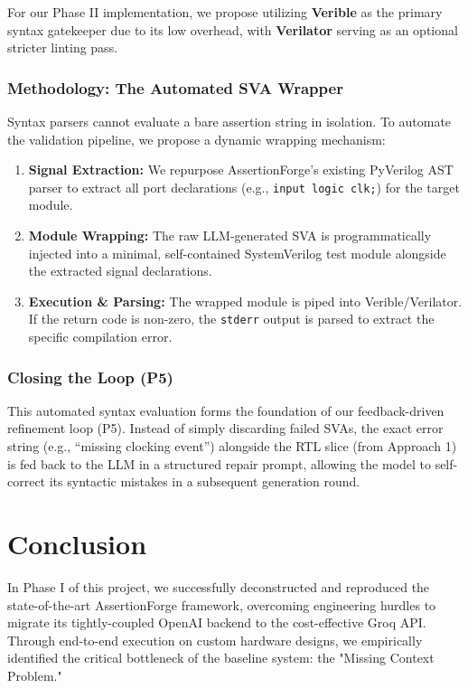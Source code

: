 \documentclass[12pt,a4paper]{article}
\begin{document}
For our Phase II implementation, we propose utilizing \textbf{Verible} as the primary syntax gatekeeper due to its low overhead, with \textbf{Verilator} serving as an optional stricter linting pass.

\subsubsection{Methodology: The Automated SVA Wrapper}

Syntax parsers cannot evaluate a bare assertion string in isolation. To automate the validation pipeline, we propose a dynamic wrapping mechanism:
\begin{enumerate}[label=\arabic*., leftmargin=*, noitemsep]
  \item \textbf{Signal Extraction:} We repurpose AssertionForge's existing PyVerilog AST parser to extract all port declarations (e.g., \texttt{input logic clk;}) for the target module.
  \item \textbf{Module Wrapping:} The raw LLM-generated SVA is programmatically injected into a minimal, self-contained SystemVerilog test module alongside the extracted signal declarations.
  \item \textbf{Execution \& Parsing:} The wrapped module is piped into Verible/Verilator. If the return code is non-zero, the \texttt{stderr} output is parsed to extract the specific compilation error.
\end{enumerate}

\subsubsection{Closing the Loop (P5)}

This automated syntax evaluation forms the foundation of our feedback-driven refinement loop (P5). Instead of simply discarding failed SVAs, the exact error string (e.g., ``missing clocking event'') alongside the RTL slice (from Approach 1) is fed back to the LLM in a structured repair prompt, allowing the model to self-correct its syntactic mistakes in a subsequent generation round.

\section{Conclusion}

In Phase I of this project, we successfully deconstructed and reproduced the state-of-the-art AssertionForge framework, overcoming engineering hurdles to migrate its tightly-coupled OpenAI backend to the cost-effective Groq API. Through end-to-end execution on custom hardware designs, we empirically identified the critical bottleneck of the baseline system: the "Missing Context Problem." 
\end{document}
